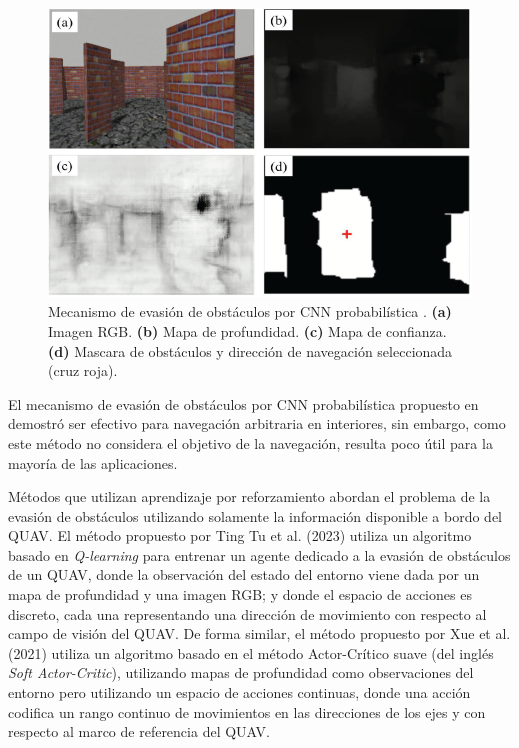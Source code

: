 \begin{figure}[H]
    \centering
    \includegraphics[scale=0.4]{partes/img/P-CNN.png}
    \caption[Mecanismo de evasión de obstáculos por CNN probabilística.]{Mecanismo de evasión de obstáculos por CNN probabilística \cite{Yang2021}. \textbf{(a)} Imagen RGB. \textbf{(b)} Mapa de profundidad. \textbf{(c)} Mapa de confianza. \textbf{(d)} Mascara de obstáculos y dirección de navegación seleccionada (cruz roja).} 
    \label{fig:P-CNN}
\end{figure}

El mecanismo de evasión de obstáculos por CNN probabilística propuesto en \cite{Yang2021} demostró ser efectivo para navegación arbitraria en interiores, sin embargo, como este método no considera el objetivo de la navegación, resulta poco útil para la mayoría de las aplicaciones.

Métodos que utilizan aprendizaje por reforzamiento abordan el problema de la evasión de obstáculos utilizando solamente la información disponible a bordo del QUAV. El método propuesto por Ting Tu et al. (2023) \cite{Tu2023} utiliza un algoritmo basado en \textit{Q-learning} para entrenar un agente dedicado a la evasión de obstáculos de un QUAV, donde la observación del estado del entorno viene dada por un mapa de profundidad y una imagen RGB; y donde el espacio de acciones es discreto, cada una representando una dirección de movimiento con respecto al campo de visión del QUAV. De forma similar, el método propuesto por Xue et al. (2021) \cite{Xue2021} utiliza un algoritmo basado en el método Actor-Crítico suave (del inglés \textit{Soft Actor-Critic}), utilizando mapas de profundidad como observaciones del entorno pero utilizando un espacio de acciones continuas, donde una acción codifica un rango continuo de movimientos en las direcciones de los ejes  y  con respecto al marco de referencia del QUAV. 

